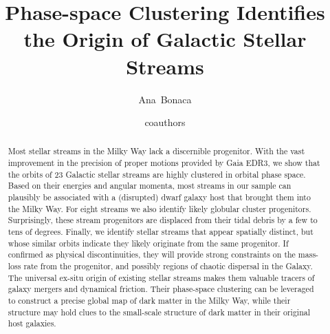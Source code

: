 \documentclass[twocolumn]{aastex63}
\begin{document}
\sloppy\sloppypar\raggedbottom\frenchspacing %

\title{Phase-space Clustering Identifies the Origin of Galactic Stellar Streams}


\author[0000-0002-7846-9787]{Ana~Bonaca}

\author{coauthors}



\begin{abstract}\noindent %
Most stellar streams in the Milky Way lack a discernible progenitor.
With the vast improvement in the precision of proper motions provided by Gaia EDR3, we show that the orbits of 23 Galactic stellar streams are highly clustered in orbital phase space.
Based on their energies and angular momenta, most streams in our sample can plausibly be associated with a (disrupted) dwarf galaxy host that brought them into the Milky Way.
For eight streams we also identify likely globular cluster progenitors.
Surprisingly, these stream progenitors are displaced from their tidal debris by a few to tens of degrees.
Finally, we identify stellar streams that appear spatially distinct, but whose similar orbits indicate they likely originate from the same progenitor.
If confirmed as physical discontinuities, they will provide strong constraints on the mass-loss rate from the progenitor, and possibly regions of chaotic dispersal in the Galaxy.
The universal ex-situ origin of existing stellar streams makes them valuable tracers of galaxy mergers and dynamical friction.
Their phase-space clustering can be leveraged to construct a precise global map of dark matter in the Milky Way, while their structure may hold clues to the small-scale structure of dark matter in their original host galaxies.
\end{abstract}
\end{document}
